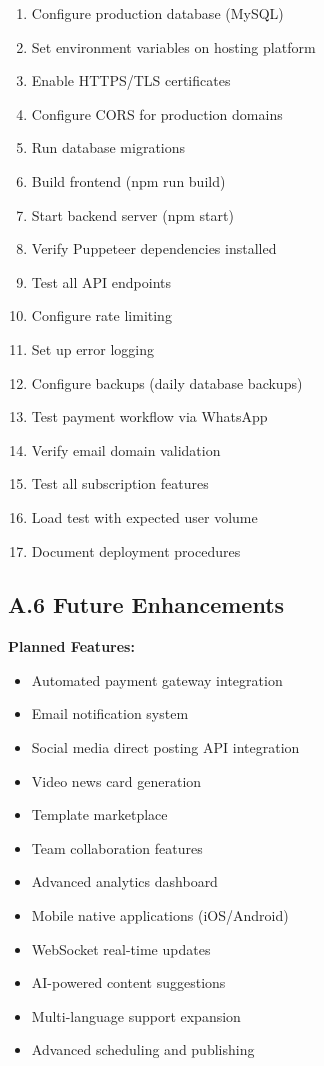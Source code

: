 \documentclass[12pt,a4paper]{article}
\begin{document}
\begin{enumerate}
    \item Configure production database (MySQL)
    \item Set environment variables on hosting platform
    \item Enable HTTPS/TLS certificates
    \item Configure CORS for production domains
    \item Run database migrations
    \item Build frontend (npm run build)
    \item Start backend server (npm start)
    \item Verify Puppeteer dependencies installed
    \item Test all API endpoints
    \item Configure rate limiting
    \item Set up error logging
    \item Configure backups (daily database backups)
    \item Test payment workflow via WhatsApp
    \item Verify email domain validation
    \item Test all subscription features
    \item Load test with expected user volume
    \item Document deployment procedures
\end{enumerate}

\subsection*{A.6 Future Enhancements}

\textbf{Planned Features:}
\begin{itemize}
    \item Automated payment gateway integration
    \item Email notification system
    \item Social media direct posting API integration
    \item Video news card generation
    \item Template marketplace
    \item Team collaboration features
    \item Advanced analytics dashboard
    \item Mobile native applications (iOS/Android)
    \item WebSocket real-time updates
    \item AI-powered content suggestions
    \item Multi-language support expansion
    \item Advanced scheduling and publishing
\end{itemize}
\end{document}
